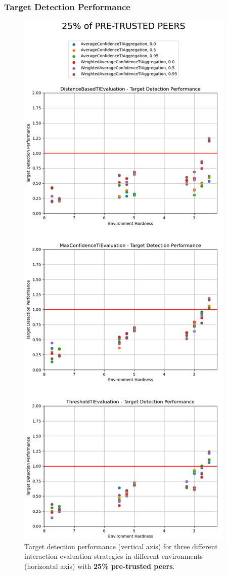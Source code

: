 \subsubsection{Target Detection Performance}
\label{subsubsec:target-detection-performance}
\begin{figure}[hp]
    \centering
    \includegraphics[height=0.9\textheight]{assets/25_target_detection.png}
    \caption{Target detection performance (vertical axis) for three different interaction evaluation strategies in different environments (horizontal axis) with \textbf{25\% pre-trusted peers}.}
    \label{fig:25-target-detection}
\end{figure}

